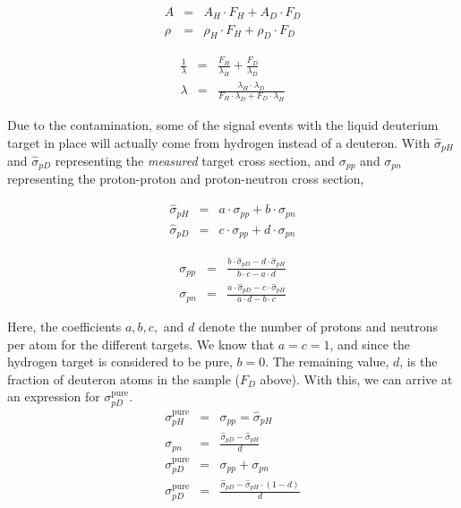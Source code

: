 \noindent\begin{minipage}{.5\linewidth}
	\begin{eqnarray}
	A & = & A_H\cdot F_H + A_D \cdot F_D \\
	\rho & = & \rho_H\cdot F_H + \rho_D \cdot F_D
	\end{eqnarray}
\end{minipage}%
\begin{minipage}{.5\linewidth}
	\begin{eqnarray}
	\frac{1}{\lambda } & = & \frac{F_H}{\lambda_H} + \frac{F_D}{\lambda_D} \\
	\lambda & = & \frac{\lambda_H \cdot \lambda_D}{F_H \cdot \lambda_D + F_D \cdot \lambda_H}	
	\end{eqnarray}
\end{minipage}
\newline

Due to the contamination, some of the signal events with the liquid deuterium target in place will actually come from hydrogen instead of a deuteron. With $\hat{\sigma}_{pH}$ and $\hat{\sigma}_{pD}$ representing the \emph{measured} target cross section, and $\sigma_{pp}$ and $\sigma_{pn}$ representing the proton-proton and proton-neutron cross section, 

\noindent\begin{minipage}{.5\linewidth}
	\begin{eqnarray}
	\hat{\sigma}_{pH} & = & a \cdot \sigma_{pp} + b \cdot \sigma_{pn} \\
	\hat{\sigma}_{pD} & = & c \cdot \sigma_{pp} + d \cdot \sigma_{pn}
	\end{eqnarray}
\end{minipage}%
\begin{minipage}{.5\linewidth}
	\begin{eqnarray}
	\sigma_{pp} & = & \frac{b \cdot \hat{\sigma}_{pD} - d \cdot \hat{\sigma}_{pH}}{b \cdot c - a \cdot d} \\
	\sigma_{pn} & = & \frac{a \cdot \hat{\sigma}_{pD} - c \cdot \hat{\sigma}_{pH}}{a \cdot d - b \cdot c}
	\end{eqnarray}
\end{minipage}
\newline

\noindent Here, the coefficients $a, b, c,$ and $d$ denote the number of protons and neutrons per atom for the different targets. We know that $a=c=1$, and since the hydrogen target is considered to be pure, $b=0$. The remaining value, $d$, is the fraction of deuteron atoms in the sample ($F_D$ above). With this, we can arrive at an expression for $\sigma_{pD}^{\text{pure}}$.
\begin{eqnarray}
\sigma_{pH}^{\text{pure}} & = & \sigma_{pp} = \hat{\sigma}_{pH} \\
\sigma_{pn} & = & \frac{\hat{\sigma}_{pD} - \hat{\sigma}_{pH}}{d} \\
\sigma_{pD}^{\text{pure}} & = & \sigma_{pp} + \sigma_{pn} \\
\sigma_{pD}^{\text{pure}} & = & \frac{\hat{\sigma}_{pD} - \hat{\sigma}_{pH}\cdot (1-d)}{d}
\end{eqnarray}

